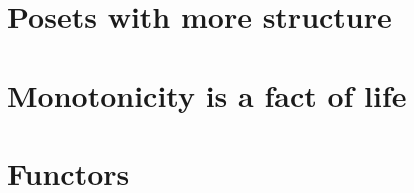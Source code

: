 \chapter{Posets with more structure}

\clearpage
%
\chapter{Monotonicity is a fact of life}

\clearpage
%
\chapter{Functors}

\clearpage


\chapter{}

\clearpage

\clearpage


